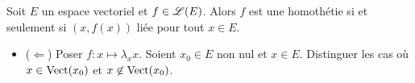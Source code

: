 \begin{tcolorbox}
    Soit $E$ un espace vectoriel et $f \in \mathscr{L}(E)$. Alors $f$ est une homothétie si et seulement si $(x, f(x))$ liée pour tout $x \in E$.
\end{tcolorbox}

\begin{itemize}
    \item ($\Leftarrow$) Poser $f:x \mapsto \lambda_x x$. Soient $x_0 \in E$ non nul et $x \in E$. Distinguer les cas où $x \in \mathrm{Vect}(x_0)$ et $x \not \in \mathrm{Vect}(x_0)$.
\end{itemize}